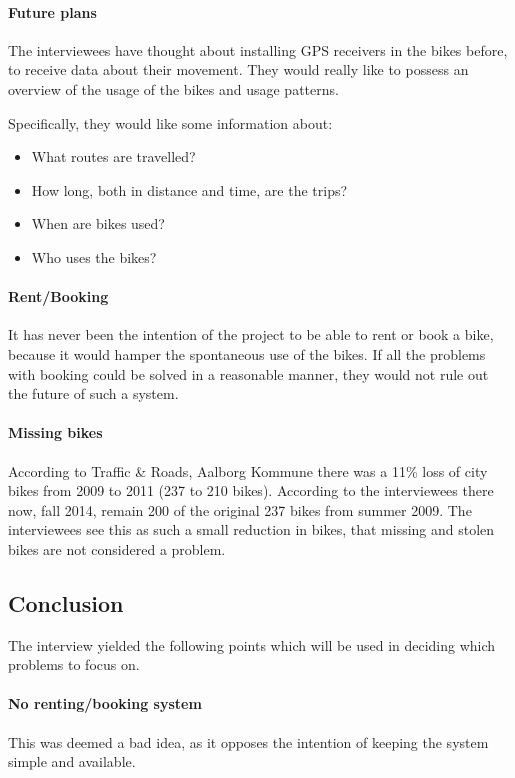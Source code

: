 \paragraph{Future plans}
The interviewees have thought about installing GPS receivers in the bikes before, to receive data about their movement.
They would really like to possess an overview of the usage of the bikes and usage patterns.

Specifically, they would like some information about:
\begin{itemize}
\item What routes are travelled?
\item How long, both in distance and time, are the trips?
\item When are bikes used?
\item Who uses the bikes?
\end{itemize}

\paragraph{Rent/Booking}
It has never been the intention of the \citybike project to be able to rent or book a bike, because it would hamper the spontaneous use of the bikes.
If all the problems with booking could be solved in a reasonable manner, they would not rule out the future of such a system.

\paragraph{Missing bikes}
According to Traffic \& Roads, Aalborg Kommune\cite{cykelplanlaegning} there was a 11\% loss of city bikes from 2009 to 2011 (237 to 210 bikes).
According to the interviewees there now, fall 2014, remain 200 of the original 237 bikes from summer 2009.
The interviewees see this as such a small reduction in bikes, that missing and stolen bikes are not considered a problem.

\subsection{Conclusion}
The interview yielded the following points which will be used in deciding which problems to focus on.

\paragraph{No renting/booking system}
This was deemed a bad idea, as it opposes the intention of keeping the system simple and available.

